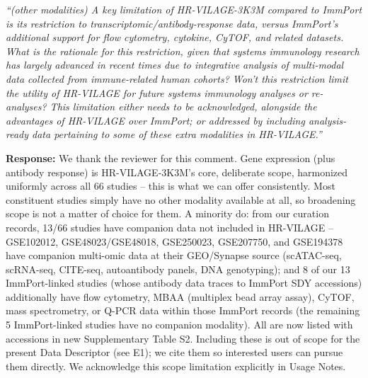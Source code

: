 \documentclass[11pt]{article}
\newcommand{\origcomment}[1]{\textit{``#1''}}
\newcommand{\filledresponse}[1]{%
  \par\medskip\noindent\textbf{Response:} #1\par
  \vspace{0.4cm}%
  \par\noindent\hrulefill\par\bigskip
}
\begin{document}
\begin{commentlist}
\item[R2-2a.] \origcomment{(other modalities) A key limitation of HR-VILAGE-3K3M compared to
ImmPort is its restriction to transcriptomic/antibody-response data, versus ImmPort's additional
support for flow cytometry, cytokine, CyTOF, and related datasets. What is the rationale for this
restriction, given that systems immunology research has largely advanced in recent times due to
integrative analysis of multi-modal data collected from immune-related human cohorts? Won't this
restriction limit the utility of HR-VILAGE for future systems immunology analyses or
re-analyses? This limitation either needs to be acknowledged, alongside the advantages of
HR-VILAGE over ImmPort; or addressed by including analysis-ready data pertaining to some of these
extra modalities in HR-VILAGE.}
\filledresponse{We thank the reviewer for this comment. Gene expression (plus antibody response)
is HR-VILAGE-3K3M's core, deliberate scope, harmonized uniformly across all 66 studies -- this is
what we can offer consistently. Most constituent studies simply have no other modality available
at all, so broadening scope is not a matter of choice for them. A minority do: from our curation
records, 13/66 studies have companion data not included in HR-VILAGE -- GSE102012, GSE48023/GSE48018,
GSE250023, GSE207750, and GSE194378 have companion multi-omic data at their GEO/Synapse source
(scATAC-seq, scRNA-seq, CITE-seq, autoantibody panels, DNA genotyping); and 8 of our 13
ImmPort-linked studies (whose antibody data traces to ImmPort SDY accessions) additionally have
flow cytometry, MBAA (multiplex bead array assay), CyTOF, mass spectrometry, or Q-PCR data within
those ImmPort records (the remaining 5 ImmPort-linked studies have no companion modality). All are
now listed with accessions in new Supplementary Table S2. Including these is out of scope for the
present Data Descriptor (see E1);
we cite them so interested users can pursue them directly. We acknowledge this scope limitation
explicitly in Usage Notes.}


\end{commentlist}
\end{document}
